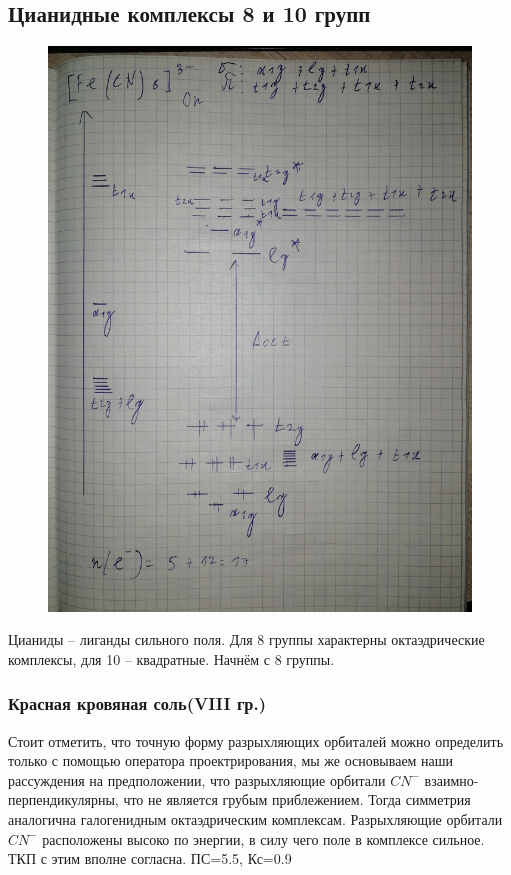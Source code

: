 \subsection{Цианидные комплексы 8 и 10 групп}

\begin{figure}[H]
\centering
\includegraphics[scale=.300]{images/cyanides.jpg}
\end{figure}

Цианиды – лиганды сильного поля. Для 8 группы характерны октаэдрические комплексы, для 10 – квадратные. Начнём с 8 группы.

\subsubsection*{Красная кровяная соль(VIII гр.)}

Стоит отметить, что точную форму разрыхляющих орбиталей можно определить только с помощью оператора проектрирования, мы же основываем наши рассуждения на предположении, что разрыхляющие орбитали $CN^-$ взаимно-перпендикулярны, что не является грубым приблежением. Тогда симметрия аналогична галогенидным октаэдрическим комплексам. Разрыхляющие орбитали $CN^-$ расположены высоко по энергии, в силу чего поле в комплексе сильное.  ТКП с этим вполне согласна. ПС=5.5, Кс=0.9 


